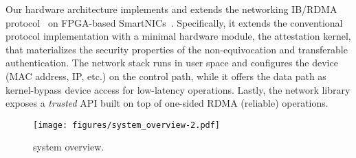 Our \projecttitle{} hardware architecture implements and extends the networking IB/RDMA protocol~\cite{rdma_specification} on FPGA-based SmartNICs~\cite{u280_smartnics}. 
Specifically, it extends the conventional protocol implementation with a minimal hardware module, the attestation kernel, that materializes the security properties of the non-equivocation and transferable authentication. The \projecttitle{} network stack runs in user space and configures the \projecttitle{} device (MAC address, IP, etc.) on the control path, while it offers the data path as kernel-bypass device access for low-latency operations. Lastly, the  \projecttitle{} network library exposes a {\em trusted} API built on top of one-sided RDMA (reliable) operations. 

\begin{figure}[t!]
    \centering
    \texttt{[image: figures/system\_overview-2.pdf]}
    \caption{\projecttitle{} system overview.}
    \label{fig:overview}
\end{figure}




